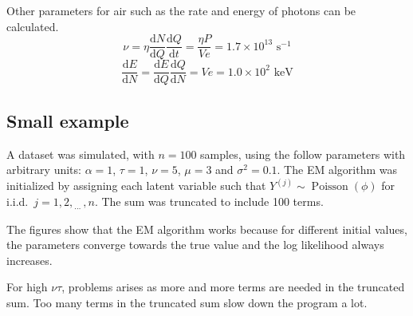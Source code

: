 \documentclass[12pt]{report}
\DeclareMathOperator{\poisson}{Poisson}
\newcommand{\diff}{\mathrm{d}}
\newcommand{\dotdotdot}{_{\phantom{.}\cdots}}
\begin{document}
Other parameters for air such as the rate and energy of photons can be calculated.
\begin{equation}
\nu = \eta \frac{\diff N}{\diff Q} \frac{\diff Q}{\diff t}=\frac{\eta P}{V e}=1.7\times10^{13}\text{ s}^{-1}
\end{equation}
\begin{equation}
\frac{\diff E}{\diff N} = \frac{\diff E}{\diff Q} \frac{\diff Q}{\diff N} = Ve = 1.0\times10^{2}\text{ keV}
\end{equation}

\subsection{Small example}
A dataset was simulated, with $n=100$ samples, using the follow parameters with arbitrary units: $\alpha=1$, $\tau=1$, $\nu=5$, $\mu=3$ and $\sigma^2=0.1$. The EM algorithm was initialized by assigning each latent variable such that $Y^{(j)}\sim\poisson(\phi)$ for i.i.d.~$j=1,2,\dotdotdot,n$. The sum was truncated to include 100 terms.

The figures show that the EM algorithm works because for different initial values, the parameters converge towards the true value and the log likelihood always increases.

For high $\nu\tau$, problems arises as more and more terms are needed in the truncated sum. Too many terms in the truncated sum slow down the program a lot.
\end{document}
